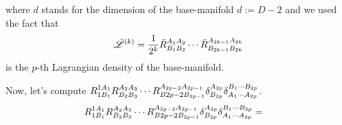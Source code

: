 where $d$ stands for the dimension of the base-manifold $d:=D-2$ and we used the fact that
\begin{equation}
  \bar{\mathscr{L}}^{(k)}=\frac{1}{2^k}\bar{R}^{A_1A_2}_{B_1B_2}\cdots \bar{R}^{A_{2k-1}A_{2k}}_{B_{2k-1}B_{2k}}
\end{equation}
is the $p$-th Lagrangian density of the base-manifold.

Now, let's compute $R^{1A_1}_{1B_1}R^{A_2A_3}_{B_2B_3}\cdots R^{A_{2p-2}A_{2p-1}}_{B{2p-2}B_{2p-1}}\delta^{A_{2p}}_{B_{2p}}\delta^{B_1\cdots B_{2p}}_{A_1\cdots A_{2p}}$.
\begin{align}
  R^{1A_1}_{1B_1}R^{A_2A_3}_{B_2B_3}\cdots R^{A_{2p-2}A_{2p-1}}_{B{2p-2}B_{2p-1}}\delta^{A_{2p}}_{B_{2p}}\delta^{B_1\cdots B_{2p}}_{A_1\cdots A_{2p}}&=
\end{align}




